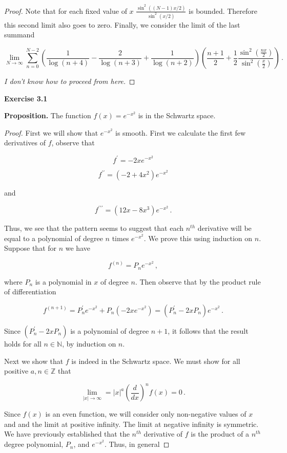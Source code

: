 \documentclass[a4paper]{article}
\numberwithin{equation}{section}
\begin{document}
\begin{description}
\begin{proof}
Note that for each fixed value of $x$ $\frac{\sin^2((N-1)x/2)}{\sin^2(x/2)}$ is bounded. Therefore this second limit also goes to zero. Finally, we consider the limit of the last summand

$$\lim\limits_{N \rightarrow \infty}\sum \limits_{n=0}^{N-2}\left( \frac{1}{\log(n+4)} -\frac{2}{\log(n+3)} +\frac{1}{\log(n+2)} \right)\left(\frac{n+1}{2} + \frac{1}{2}\frac{\sin^2(\frac{nx}{2})}{\sin^2(\frac{x}{2})}\right)\,.$$

\textit{I don't know how to proceed from here.}

\end{proof}

\item \textbf{Exercise 3.1}

\item \textbf{Proposition.} The function $f(x) = e^{-x^2}$ is in the Schwartz space.

\begin{proof} First we will show that $e^{-x^2}$ is smooth. First we calculate the first few derivatives of $f$, observe that

$$f^{\prime} = -2xe^{-x^2}$$

$$f^{\prime\prime} = (-2 +4x^2)e^{-x^2}$$

and

$$f^{\prime\prime\prime} = (12x-8x^3)e^{-x^2}\,.$$

Thus, we see that the pattern seems to suggest that each $n^{th}$ derivative will be equal to a polynomial of degree $n$ times $e^{-x^2}$. We prove this using induction on $n$. Suppose that for $n$ we have

$$f^{(n)} = P_ne^{-x^2}\,,$$

where $P_n$ is a polynomial in $x$ of degree $n$. Then observe that by the product rule of differentiation

$$f^{(n+1)} = P_n^{\prime}e^{-x^2} + P_n(-2xe^{-x^2}) = (P_n^{\prime} -2xP_n)e^{-x^2}\,.$$ 

Since $(P_n^{\prime} -2xP_n)$ is a polynomial of degree $n+1$, it follows that the result holds for all $n \in \mathbb{N}$, by induction on $n$.

Next we show that $f$ is indeed in the Schwartz space. We must show for all positive $a,n \in \mathbb{Z}$ that 

$$\lim \limits_{|x|\rightarrow \infty} = |x|^a(\frac{d}{dx})^n f(x) = 0\,.$$

Since $f(x)$ is an even function, we will consider only non-negative values of $x$ and and the limit at positive infinity. The limit at negative infinity is symmetric. We have previously established that the $n^{th}$ derivative of $f$ is the product of a $n^{th}$ degree polynomial, $P_n$, and $e^{-x^2}$. Thus, in general


\end{proof}
\end{description}
\end{document}
